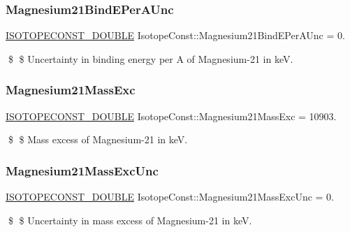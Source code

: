 \subsubsection{\texorpdfstring{Magnesium21\+Bind\+E\+Per\+A\+Unc}{Magnesium21BindEPerAUnc}}
{\footnotesize\ttfamily \mbox{\hyperlink{group___isotope_const-_macros_ga8f45a7272ce02c0b4c65c44636ed719a}{I\+S\+O\+T\+O\+P\+E\+C\+O\+N\+S\+T\+\_\+\+D\+O\+U\+B\+LE}} Isotope\+Const\+::\+Magnesium21\+Bind\+E\+Per\+A\+Unc = 0.}

\$ \$ Uncertainty in binding energy per A of Magnesium-\/21 in keV. \mbox{\label{group___isotope_const-_magnesium-_mg21_ga92495c0a166f4a9167549990d5d01045}} 
\subsubsection{\texorpdfstring{Magnesium21\+Mass\+Exc}{Magnesium21MassExc}}
{\footnotesize\ttfamily \mbox{\hyperlink{group___isotope_const-_macros_ga8f45a7272ce02c0b4c65c44636ed719a}{I\+S\+O\+T\+O\+P\+E\+C\+O\+N\+S\+T\+\_\+\+D\+O\+U\+B\+LE}} Isotope\+Const\+::\+Magnesium21\+Mass\+Exc = 10903.}

\$ \$ Mass excess of Magnesium-\/21 in keV. \mbox{\label{group___isotope_const-_magnesium-_mg21_ga511ab36d60d451d95785d67392c11339}} 
\subsubsection{\texorpdfstring{Magnesium21\+Mass\+Exc\+Unc}{Magnesium21MassExcUnc}}
{\footnotesize\ttfamily \mbox{\hyperlink{group___isotope_const-_macros_ga8f45a7272ce02c0b4c65c44636ed719a}{I\+S\+O\+T\+O\+P\+E\+C\+O\+N\+S\+T\+\_\+\+D\+O\+U\+B\+LE}} Isotope\+Const\+::\+Magnesium21\+Mass\+Exc\+Unc = 0.}

\$ \$ Uncertainty in mass excess of Magnesium-\/21 in keV. \mbox{\label{group___isotope_const-_magnesium-_mg21_ga0f66a2c09191f9103847cde5e2038afe}} 

